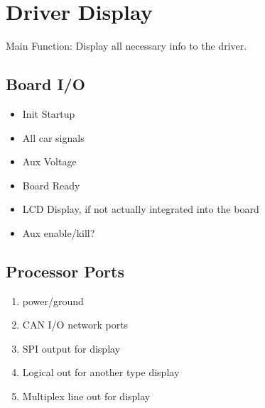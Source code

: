 \documentclass[letterpaper,12pt]{article}
\begin{document}
\pagebreak
\section{Driver Display}
Main Function: Display all necessary info to the driver.
   \subsection{Board I/O}
   \begin{multicols}{2}
   
   \begin{itemize}
      \item Init Startup
      \item All car signals
   \end{itemize}
   
   \begin{itemize}
      \item Aux Voltage
   \end{itemize}
   
   \columnbreak
   

   \begin{itemize}
      \item Board Ready
   \end{itemize}
   
   \begin{itemize}
      \item LCD Display, if not actually integrated into the board
      \item Aux enable/kill?
   \end{itemize}
   \end{multicols}

   \subsection{Processor Ports}
   \begin{multicols}{2}
   \begin{enumerate}[(a.)]
      \item power/ground
      \item CAN I/O network ports 
   \columnbreak
      \item SPI output for display
      \item Logical out for another type display
      \item Multiplex line out for display
   \end{enumerate}
   \end{multicols}
\end{document}
